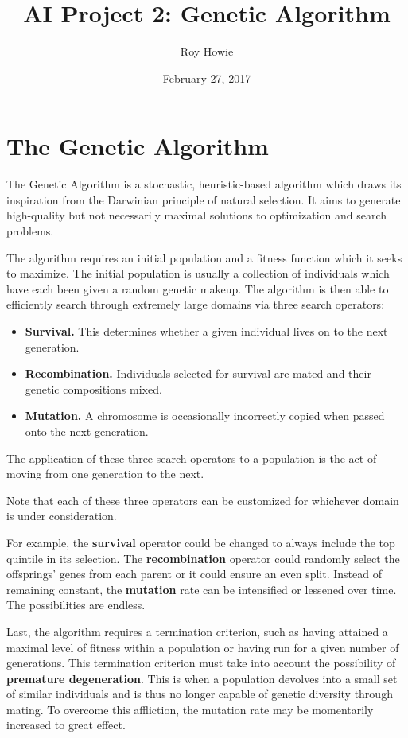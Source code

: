 \documentclass{article}
\begin{document}
\title{\vspace{-1cm}AI Project 2: Genetic Algorithm}
\author{Roy Howie}
\date{February 27, 2017}
\maketitle

\section{The Genetic Algorithm}
  The Genetic Algorithm is a stochastic, heuristic-based algorithm which draws
  its inspiration from the Darwinian principle of natural selection. It aims to
  generate high-quality but not necessarily maximal solutions to optimization
  and search problems.

  The algorithm requires an initial population and a fitness function which it
  seeks to maximize. The initial population is usually a collection of
  individuals which have each been given a random genetic makeup. The algorithm
  is then able to efficiently search through extremely large domains via three
  search operators:
  \begin{itemize}
    \renewcommand\labelitemi{}
    \item{
      \textbf{Survival.} This determines whether a given individual lives on to
      the next generation.
    }
    \item{
      \textbf{Recombination.} Individuals selected for survival are mated and
      their genetic compositions mixed.
    }
    \item{
      \textbf{Mutation.} A chromosome is occasionally incorrectly copied when
      passed onto the next generation.
    }
  \end{itemize}
  The application of these three search operators to a population is the act of
  moving from one generation to the next.

  Note that each of these three operators can be customized for whichever domain
  is under consideration.

  For example, the \textbf{survival} operator could be changed to always include
  the top quintile in its selection. The \textbf{recombination} operator could
  randomly select the offsprings' genes from each parent or it could ensure an
  even split. Instead of remaining constant, the \textbf{mutation} rate can be
  intensified or lessened over time. The possibilities are endless.

  Last, the algorithm requires a termination criterion, such as having
  attained a maximal level of fitness within a population or having run for a
  given number of generations. This termination criterion must take into account
  the possibility of \textbf{premature degeneration}. This is when a population
  devolves into a small set of similar individuals and is thus no longer capable
  of genetic diversity through mating. To overcome this affliction, the mutation
  rate may be momentarily increased to great effect.
\end{document}
